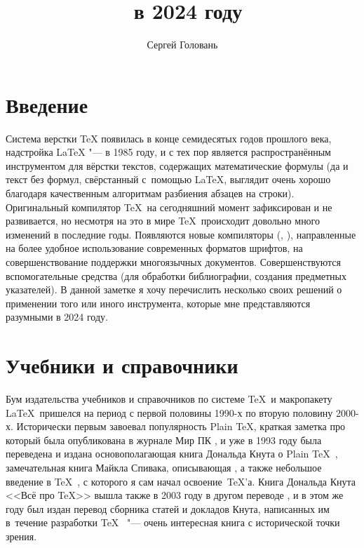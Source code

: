 \documentclass[a4paper,12pt,hyphens]{article}
\title{\sffamily\myLaTeX\ в 2024 году}
\author{Сергей Головань}
\begin{document}
\vspace*{7cm}
%
\vspace{-\baselineskip}%
{\let\newpage\relax\maketitle}
\thispagestyle{empty}

\clearpage
{}%
\vspace{-\baselineskip}%
\tableofcontents

\clearpage
\section{Введение}
Система верстки \TeX{} появилась в конце семидесятых годов прошлого века,
надстройка \LaTeX{} "--- в 1985 году, и с тех пор является распространённым
инструментом для вёрстки текстов, содержащих математические формулы (да и текст
без формул, свёрстанный с~помощью \LaTeX, выглядит очень хорошо благодаря
качественным алгоритмам разбиения абзацев на строки). Оригинальный компилятор
\TeX\ на сегодняшний момент зафиксирован и не развивается, но несмотря на это
в мире \TeX\ происходит довольно много изменений в последние годы. Появляются
новые компиляторы (\XeTeX{}, \LuaTeX{}), направленные
на более удобное использование
современных форматов шрифтов, на совершенствование поддержки многоязычных
документов. Совершенствуются вспомогательные средства (для обработки
библиографии, создания предметных указателей). В данной заметке я хочу
перечислить несколько своих решений о применении того или иного инструмента,
которые мне представляются разумными в 2024 году.

\section{Учебники и справочники}
Бум издательства учебников и справочников по системе \TeX\ и макропакету \LaTeX\ пришелся
на период с первой половины 1990-х по вторую половину 2000-х. Исторически первым завоевал
популярность Plain \TeX, краткая заметка про который была опубликована в журнале Мир ПК \parencite{vinogradov:1992},
и уже в 1993 году была переведена и издана основополагающая книга Дональда Кнута о Plain \TeX\ \parencite{knuth:1993},
замечательная книга Майкла Спивака, описывающая  \parencite{spivak:1993}, а также
небольшое введение в \TeX\ \parencite{evgrafov-evgrafov:1993}, с которого я сам начал освоение~\TeX'а.
Книга Дональда Кнута <<Всё про \TeX>> вышла также в 2003 году в другом переводе \parencite{knuth:2003a}, и в этом же году
был издан перевод сборника статей и докладов Кнута, написанных им в~течение разработки \TeX\ \parencite{knuth:2003b} "---
очень интересная книга с исторической точки зрения.
\end{document}
